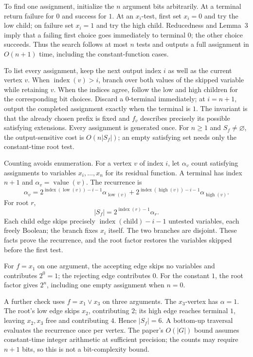 To find one assignment, initialize the \(n\) argument bits arbitrarily.
At a terminal return failure for \(0\) and success for \(1\). At an
\(x_i\)-test, first set \(x_i=0\) and try the low child; on failure set
\(x_i=1\) and try the high child. Reducedness and Lemma~3 imply that a failing
first choice goes immediately to terminal \(0\); the other choice succeeds.
Thus the search follows at most \(n\) tests and outputs a full assignment in
\(O(n+1)\) time, including the constant-function cases.

To list every assignment, keep the next output index \(i\) as well as the
current vertex \(v\). When \(\operatorname{index}(v)>i\), branch over both
values of the skipped variable while retaining \(v\). When the indices
agree, follow the low and high children for the corresponding bit choices.
Discard a \(0\)-terminal immediately; at \(i=n+1\), output the completed
assignment exactly when the terminal is \(1\). The invariant is that the
already chosen prefix is fixed and \(f_v\) describes precisely its possible
satisfying extensions. Every assignment is generated once. For \(n\geq1\)
and \(S_f\ne\varnothing\), the output-sensitive cost is \(O(n|S_f|)\);
an empty satisfying set needs only the constant-time root test.

Counting avoids enumeration. For a vertex \(v\) of index \(i\), let
\(\alpha_v\) count satisfying assignments to variables \(x_i,\ldots,x_n\)
for its residual function. A terminal has index \(n+1\) and
\(\alpha_v=\operatorname{value}(v)\). The recurrence is
\[
 \alpha_v=
  2^{\operatorname{index}(\operatorname{low}(v))-i-1}
       \alpha_{\operatorname{low}(v)}
  +2^{\operatorname{index}(\operatorname{high}(v))-i-1}
       \alpha_{\operatorname{high}(v)}.
\]
For root \(r\),
\[
 |S_f|=2^{\operatorname{index}(r)-1}\alpha_r.
\]
Each child edge skips precisely
\(\operatorname{index}(\text{child})-i-1\) untested variables, each freely
Boolean; the branch fixes \(x_i\) itself. The two branches are disjoint.
These facts prove the recurrence, and the root factor restores the variables
skipped before the first test.

For \(f=x_1\) on one argument, the accepting edge skips no variables and
contributes \(2^0=1\); the rejecting edge contributes \(0\).
For the constant \(1\), the root factor gives \(2^n\), including one empty
assignment when \(n=0\).

A further check uses \(f=x_1\lor x_3\) on three arguments. The \(x_3\)-vertex
has \(\alpha=1\). The root's low edge skips \(x_2\), contributing \(2\);
its high edge reaches terminal \(1\), leaving \(x_2,x_3\) free and
contributing \(4\). Hence \(|S_f|=6\). A bottom-up traversal evaluates the
recurrence once per vertex. The paper's \(O(|G|)\) bound assumes
constant-time integer arithmetic at sufficient precision; the counts may
require \(n+1\) bits, so this is not a bit-complexity bound.

